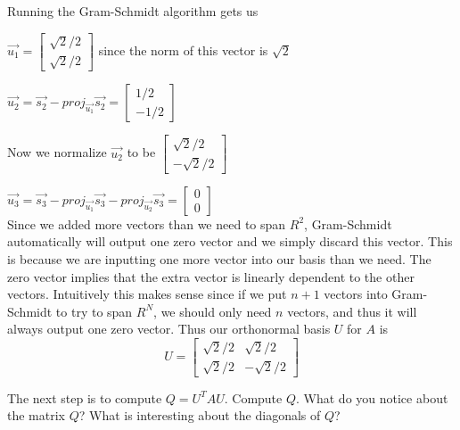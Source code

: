 \begin{enumerate}
{    Running the Gram-Schmidt algorithm gets us 

    $\vec{u_1} = \begin{bmatrix}
        \sqrt{2}/2 \\
        \sqrt{2}/2  
    \end{bmatrix}$ since the norm of this vector is $\sqrt{2}$


    $\vec{u_2} = \vec{s_2} - proj_{\vec{u_1}}\vec{s_2} = \begin{bmatrix}
        1/2 \\
        -1/2
    \end{bmatrix}$ 

    Now we normalize $\vec{u_2}$ to be 
    $
    \begin{bmatrix}
        \sqrt{2}/2\\
        -\sqrt{2}/2
    \end{bmatrix}
    $
    
    $\vec{u_3} = \vec{s_3} - proj_{\vec{u_1}}\vec{s_3} - proj_{\vec{u_2}}\vec{s_3} = 
    \begin{bmatrix}
        0 \\
        0 
    \end{bmatrix}$ \\

    Since we added more vectors than we need to span $R^2$, Gram-Schmidt automatically will output one zero vector and we simply 
    discard this vector. This is because we are inputting one more vector into our basis than we need. The zero vector implies that
    the extra vector is linearly dependent to the other vectors. Intuitively this makes sense since if we put $n+1$ vectors into 
    Gram-Schmidt to try to span $R^N$, we should only need $n$ vectors, and thus it will always output one zero vector. 
    Thus our orthonormal basis $U$ for $A$ is 
    \[
    U = \begin{bmatrix}
    \sqrt{2}/2 &  \sqrt{2}/2\\
    \sqrt{2}/2 &  -\sqrt{2}/2
    \end{bmatrix}
    \]

    }

    \qitem The next step is to compute $Q = U^TAU$. Compute $Q$. What do you notice about the matrix 
    $Q$? What is interesting about the diagonals of $Q$?
    \ws{
    \vspace{150px}
    }


\end{enumerate}
